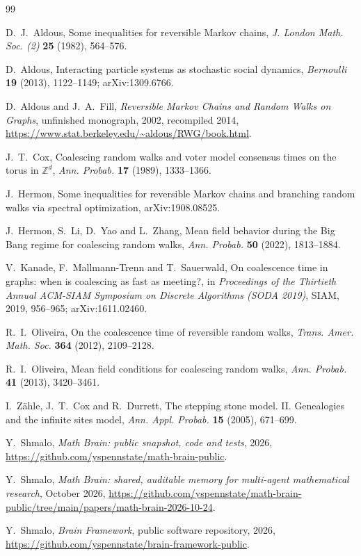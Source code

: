 \documentclass[11pt,a4paper]{article}
\numberwithin{equation}{section}
\theoremstyle{remark}
\begin{document}
\begin{thebibliography}{99}

 D.~J.~Aldous, Some inequalities for reversible Markov chains, \emph{J. London Math. Soc. (2)} \textbf{25} (1982), 564--576.

 D.~Aldous, Interacting particle systems as stochastic social dynamics, \emph{Bernoulli} \textbf{19} (2013), 1122--1149; arXiv:1309.6766.

 D.~Aldous and J.~A.~Fill, \emph{Reversible Markov Chains and Random Walks on Graphs}, unfinished monograph, 2002, recompiled 2014, \url{https://www.stat.berkeley.edu/~aldous/RWG/book.html}.

 J.~T.~Cox, Coalescing random walks and voter model consensus times on the torus in $\mathbb Z^d$, \emph{Ann. Probab.} \textbf{17} (1989), 1333--1366.

 J.~Hermon, Some inequalities for reversible Markov chains and branching random walks via spectral optimization, arXiv:1908.08525.

 J.~Hermon, S.~Li, D.~Yao and L.~Zhang, Mean field behavior during the Big Bang regime for coalescing random walks, \emph{Ann. Probab.} \textbf{50} (2022), 1813--1884.

 V.~Kanade, F.~Mallmann-Trenn and T.~Sauerwald, On coalescence time in graphs: when is coalescing as fast as meeting?, in \emph{Proceedings of the Thirtieth Annual ACM-SIAM Symposium on Discrete Algorithms (SODA 2019)}, SIAM, 2019, 956--965; arXiv:1611.02460.

 R.~I.~Oliveira, On the coalescence time of reversible random walks, \emph{Trans. Amer. Math. Soc.} \textbf{364} (2012), 2109--2128.

 R.~I.~Oliveira, Mean field conditions for coalescing random walks, \emph{Ann. Probab.} \textbf{41} (2013), 3420--3461.

 I.~Z\"ahle, J.~T.~Cox and R.~Durrett, The stepping stone model. II. Genealogies and the infinite sites model, \emph{Ann. Appl. Probab.} \textbf{15} (2005), 671--699.

 Y.~Shmalo, \emph{Math Brain: public snapshot, code and tests}, 2026, \url{https://github.com/yspennstate/math-brain-public}.

 Y.~Shmalo, \emph{Math Brain: shared, auditable memory for multi-agent mathematical research}, October 2026, \url{https://github.com/yspennstate/math-brain-public/tree/main/papers/math-brain-2026-10-24}.

 Y.~Shmalo, \emph{Brain Framework}, public software repository, 2026, \url{https://github.com/yspennstate/brain-framework-public}.

\end{thebibliography}
\end{document}
